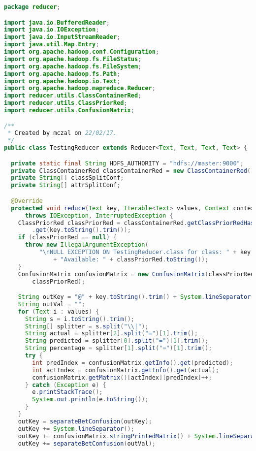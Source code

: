 \begin{lstlisting}[language=Java,basicstyle=\tiny,caption=TestingReducer.java]
package reducer;

import java.io.BufferedReader;
import java.io.IOException;
import java.io.InputStreamReader;
import java.util.Map.Entry;
import org.apache.hadoop.conf.Configuration;
import org.apache.hadoop.fs.FileStatus;
import org.apache.hadoop.fs.FileSystem;
import org.apache.hadoop.fs.Path;
import org.apache.hadoop.io.Text;
import org.apache.hadoop.mapreduce.Reducer;
import reducer.utils.ClassContainerRed;
import reducer.utils.ClassPriorRed;
import reducer.utils.ConfusionMatrix;

/**
 * Created by mczal on 22/02/17.
 */
public class TestingReducer extends Reducer<Text, Text, Text, Text> {

  private static final String HDFS_AUTHORITY = "hdfs://master:9000";
  private ClassContainerRed classContainerRed = new ClassContainerRed();
  private String[] classSplitConf;
  private String[] attrSplitConf;

  @Override
  protected void reduce(Text key, Iterable<Text> values, Context context)
      throws IOException, InterruptedException {
    ClassPriorRed classPriorRed = classContainerRed.getClassPriorRedHashMap()
        .get(key.toString().trim());
    if (classPriorRed == null) {
      throw new IllegalArgumentException(
          "\nNULL EXCEPTION ON TestingReducer.class for class: " + key.toString().trim() + "\n"
              + "Available: " + classPriorRed.toString());
    }
    ConfusionMatrix confusionMatrix = new ConfusionMatrix(classPriorRed.getValues().size(),
        classPriorRed);

    String outKey = "@" + key.toString().trim() + System.lineSeparator();
    String outVal = "";
    for (Text i : values) {
      String s = i.toString().trim();
      String[] splitter = s.split("\\|");
      String actual = splitter[2].split("=")[1].trim();
      String predicted = splitter[0].split("=")[1].trim();
      String percentage = splitter[1].split("=")[1].trim();
      try {
        int predIndex = confusionMatrix.getInfo().get(predicted);
        int actIndex = confusionMatrix.getInfo().get(actual);
        confusionMatrix.getMatrix()[actIndex][predIndex]++;
      } catch (Exception e) {
        e.printStackTrace();
        System.out.println(e.toString());
      }
    }
    outKey = separateBetConfusion(outKey);
    outKey += System.lineSeparator();
    outKey += confusionMatrix.stringPrintedMatrix() + System.lineSeparator();
    outKey += separateBetConfusion(outVal);


\end{lstlisting}
